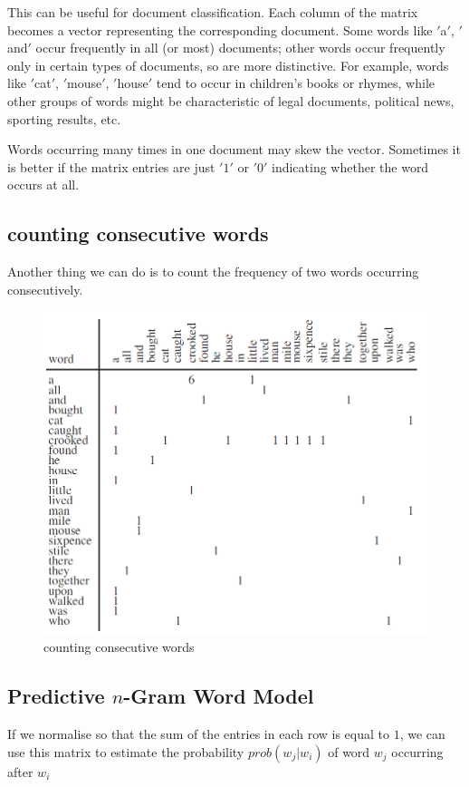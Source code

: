 \documentclass[11pt]{article}
\begin{document}
This can be useful for document classification.
Each column of the matrix becomes a vector representing the corresponding document.
Some words like \('\)a\('\), \('\)and\('\) occur frequently in all (or most) documents;
other words occur frequently only in certain types of documents, so are more distinctive.
For example, words like \('\)cat\('\), \('\)mouse\('\), \('\)house\('\) tend to occur in children’s books or rhymes, while other groups of words might be characteristic of legal documents, political news, sporting results, etc.

Words occurring many times in one document may skew the vector.
Sometimes it is better if the matrix entries are just \('1'\) or \('0'\) indicating whether the word occurs at all.

\subsection{counting consecutive words}\label{subsec:counting-consecutive-words}
Another thing we can do is to count the frequency of two words occurring consecutively.

\begin{figure}[H]
    \centering
    \includegraphics{../out/images/counting-consecutive-words}
    \caption[counting consecutive words]{counting consecutive words}
    \label{fig:counting consecutive words}
\end{figure}

\subsection{Predictive $n$-Gram Word Model}\label{subsec:predictive-$n$-gram-word-model}
If we normalise so that the sum of the entries in each row is equal to $1$, we can use this matrix to estimate the probability $prob(w_j | w_i)$ of word $w_j$ occurring after $w_i$
\end{document}

